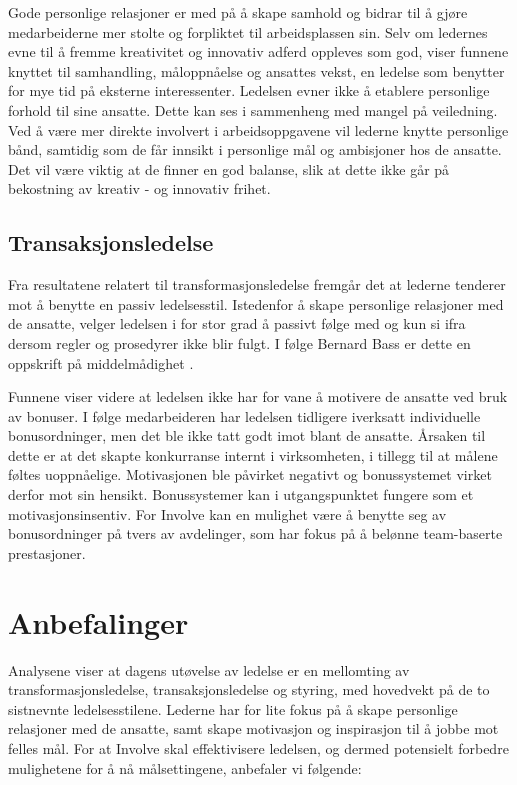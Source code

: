 \indent \newline
Gode personlige relasjoner er med på å skape samhold og bidrar til å gjøre medarbeiderne mer stolte og forpliktet til arbeidsplassen sin. Selv om ledernes evne til å fremme kreativitet og innovativ adferd oppleves som god, viser funnene knyttet til samhandling, måloppnåelse og ansattes vekst, en ledelse som benytter for mye tid på eksterne interessenter. Ledelsen evner ikke å etablere personlige forhold til sine ansatte. Dette kan ses i sammenheng med mangel på veiledning. Ved å være mer direkte involvert i arbeidsoppgavene vil lederne knytte personlige bånd, samtidig som de får innsikt i personlige mål og ambisjoner hos de ansatte. Det vil være viktig at de finner en god balanse, slik at dette ikke går på bekostning av kreativ - og innovativ frihet.

\subsection{Transaksjonsledelse}
Fra resultatene relatert til transformasjonsledelse fremgår det at lederne tenderer mot å benytte en passiv ledelsesstil. Istedenfor å skape personlige relasjoner med de ansatte, velger ledelsen i for stor grad å passivt følge med og kun si ifra dersom regler og prosedyrer ikke blir fulgt. I følge Bernard Bass er dette en oppskrift på middelmådighet  \cite[s.~74]{PerspektiverLedelse}.

\indent \newline
Funnene viser videre at ledelsen ikke har for vane å motivere de ansatte ved bruk av bonuser. I følge medarbeideren har ledelsen tidligere iverksatt individuelle bonusordninger, men det ble ikke tatt godt imot blant de ansatte. Årsaken til dette er at det skapte konkurranse internt i virksomheten, i tillegg til at målene føltes uoppnåelige. Motivasjonen ble påvirket negativt og bonussystemet virket derfor mot sin hensikt. Bonussystemer kan i utgangspunktet fungere som et motivasjonsinsentiv. For Involve kan en mulighet være å benytte seg av bonusordninger på tvers av avdelinger, som har fokus på å belønne team-baserte prestasjoner. 

\section{Anbefalinger}
Analysene viser at dagens utøvelse av ledelse er en mellomting av transformasjonsledelse, transaksjonsledelse og styring, med hovedvekt på de to sistnevnte ledelsesstilene. Lederne har for lite fokus på å skape personlige relasjoner med de ansatte, samt skape motivasjon og inspirasjon til å jobbe mot felles mål. For at Involve skal effektivisere ledelsen, og dermed potensielt forbedre mulighetene for å nå målsettingene, anbefaler vi følgende:

